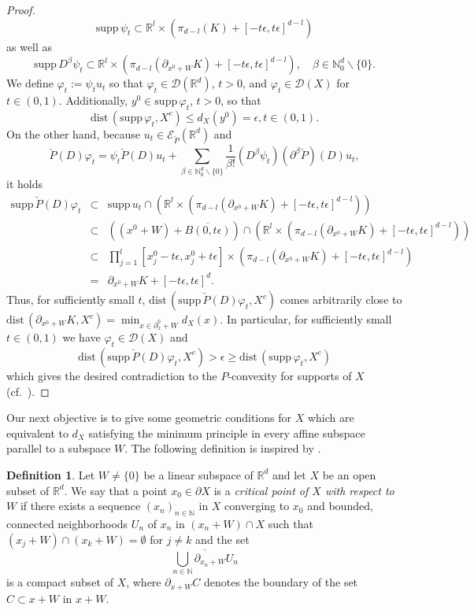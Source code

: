 \documentclass[a4paper,10pt]{amsart}
\newtheorem*{crucial lemma}{Lemma \ref{lem:nice polynomial2}}
\theoremstyle{definition}
\newtheorem{definition}[theorem]{Definition}
\newcommand{\R}{\mathbb{R}}
\newcommand{\N}{\mathbb{N}}
\newcommand{\supp}{\mbox{supp}\,}
\newcommand{\dist}{\mbox{dist}\,}
\begin{document}
\begin{proof}
	\[\supp\psi_t\subset \R^l\times\left(\pi_{d-l}(K)+[-t\epsilon,t\epsilon]^{d-l}\right)\]
	as well as
	\[\supp D^\beta\psi_t\subset\R^l\times\left(\pi_{d-l}\left(\partial_{x^0+W}K\right)+[-t\epsilon,t\epsilon]^{d-l}\right),\quad \beta\in\N_0^d\backslash\{0\}.\]
	We define $\varphi_t:=\psi_t u_t$ so that $\varphi_t\in\mathscr{D}(\R^d)$, $t>0$, and $\varphi_t\in \mathscr{D}(X)$ for $t\in (0,1)$. Additionally, $y^0\in \supp\varphi_t$, $t>0$, so that
	\[\dist(\supp\varphi_t,X^c)\leq d_X(y^0)=\epsilon, t\in (0,1).\]
	On the other hand, because $u_t\in \mathscr{E}_{\check{P}}(\R^d)$ and 
	\[\check{P}(D)\varphi_t=\psi_t\check{P}(D)u_t+\sum_{\beta\in\N_0^d\backslash\{0\}}\frac{1}{\beta!}\left(D^\beta\psi_t\right)(\partial^\beta\check{P})(D)u_t,\]
	it holds
	\begin{eqnarray*}
		\supp\check{P}(D)\varphi_t&\subset &\supp u_t\cap \left(\R^l\times\left(\pi_{d-l}\left(\partial_{x^0+W}K\right)+[-t\epsilon,t\epsilon]^{d-l}\right)\right)\\
		&\subset& \left(\left(x^0+W\right)+\overline{B(0,t\epsilon)}\right)\cap\left(\R^l\times\left(\pi_{d-l}\left(\partial_{x^0+W}K\right)+[-t\epsilon,t\epsilon]^{d-l}\right)\right)\\
		&\subset&\prod_{j=1}^l \left[x^0_j-t\epsilon,x^0_j+t\epsilon\right]\times\left(\pi_{d-l}\left(\partial_{x^0+W}K\right)+[-t\epsilon,t\epsilon]^{d-l}\right)\\
		&=&\partial_{x^0+W}K+[-t\epsilon,t\epsilon]^d.
	\end{eqnarray*}
	Thus, for sufficiently small $t$, $\dist(\supp\check{P}(D)\varphi_t,X^c)$ comes arbitrarily close to $\dist(\partial_{x^0+W}K,X^c)=\min_{x\in\partial_x^0+W}d_X(x)$. In particular, for sufficiently small $t\in(0,1)$ we have $\varphi_t\in\mathscr{D}(X)$ and
	\[\dist(\supp\check{P}(D)\varphi_t,X^c)>\epsilon\geq \dist(\supp\varphi_t,X^c)\]
	which gives the desired contradiction to the $P$-convexity for supports of $X$ (cf.~\cite[Theorem 10.6.3]{Hor2}).
\end{proof}

Our next objective is to give some geometric conditions for $X$ which are equivalent to $d_X$ satisfying the minimum principle in every affine subspace parallel to a subspace $W$. The following definition is inspired by \cite{Zachmanoglou69}.
\begin{definition}\label{def:critical points}
	Let $W\neq\{0\}$ be a linear subspace of $\R^d$ and let $X$ be an open subset of $\R^d$. We say that a point $x_0\in\partial X$ is a \emph{critical point of $X$ with respect to $W$} if there exists a sequence $(x_n)_{n\in\N}$ in $X$ converging to $x_0$ and bounded, connected neighborhoods $U_n$ of $x_n$ in $(x_n+W)\cap X$ such that $(x_j+W)\cap(x_k+W)=\emptyset$ for $j\neq k$ and the set
		\[\overline{\bigcup_{n\in\N}\partial_{x_n+W} U_n}\]
        is a compact subset of $X$, where $\partial_{x+W}C$ denotes the boundary of the set $C\subset x+W$ in $x+W$.
\end{definition}
\end{document}
